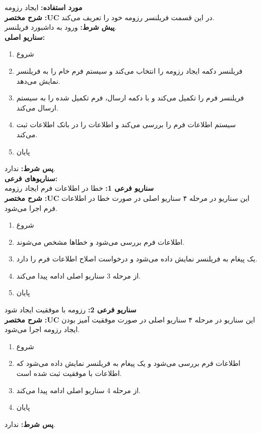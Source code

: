 \textbf{مورد استفاده:}
ایجاد رزومه
\\
\textbf{شرح مختصر :UC}
در این قسمت فریلنسر رزومه خود را تعریف می‌کند.
\\
\textbf{پيش شرط:}
ورود به داشبورد فریلنسر.
\\
\textbf{سناريو اصلی:}
\begin{enumerate}
\item
شروع
\item
فریلنسر دکمه ایجاد رزومه را انتخاب می‌کند و سیستم فرم خام را به فریلنسر نمایش می‌دهد.
\item
فریلنسر فرم را تکمیل می‌کند و با دکمه ارسال، فرم تکمیل شده را به سیستم ارسال می‌کند.
\item
سیستم اطلاعات فرم را بررسی می‌کند و اطلاعات را در بانک اطلاعات ثبت می‌کند.
\item
پایان
\end{enumerate}

\noindent
\textbf{پس شرط:}
ندارد.
\\
\textbf{سناريوهای فرعی:}
\\
\textbf{سناريو فرعی 1:}
خطا در اطلاعات فرم ایجاد رزومه
\\
\textbf{شرح مختصر :UC}
این سناریو در مرحله ۴ سناریو اصلی در صورت خطا در اطلاعات فرم اجرا می‌شود.
\begin{enumerate}
\item
شروع
\item
اطلاعات فرم بررسی می‌شود و خطاها مشخص می‌شوند.
\item
یک پیغام به فریلنسر نمایش داده می‌شود و درخواست اصلاح اطلاعات فرم را دارد.
\item
از مرحله 3 سناریو اصلی ادامه پیدا می‌کند.
\item
پایان
\end{enumerate}

\noindent
\textbf{سناريو فرعی 2:}
رزومه با موفقیت ایجاد شود
\\
\textbf{شرح مختصر :UC}
این سناریو در مرحله ۴ سناریو اصلی در صورت موفقیت آمیز بودن ایجاد رزومه اجرا می‌شود.
\begin{enumerate}
\item
شروع
\item
اطلاعات فرم بررسی می‌شود و یک پیغام به فریلنسر نمایش داده می‌شود که اطلاعات با موفقیت ثبت شده است.
\item
از مرحله 4 سناریو اصلی ادامه پیدا می‌کند.
\item
پایان
\end{enumerate}

\noindent
\textbf{پس شرط:}
ندارد.



